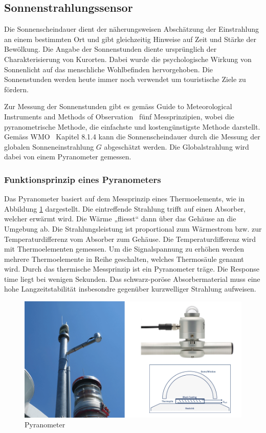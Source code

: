 \subsection{Sonnenstrahlungssensor}
Die Sonnenscheindauer dient der näherungsweisen Abschätzung der Einstrahlung an einem bestimmten Ort und gibt gleichzeitig Hinweise auf Zeit und Stärke der Bewölkung. Die Angabe der Sonnenstunden diente ursprünglich der Charakterisierung von Kurorten. Dabei wurde die psychologische Wirkung von Sonnenlicht auf das menschliche Wohlbefinden hervorgehoben. Die Sonnenstunden werden heute immer noch verwendet um touristische Ziele zu fördern. 

\noindent
Zur Messung der Sonnenstunden gibt es gemäss  \flqq Guide to Meteorological Instruments and Methods of Observation\frqq ~\cite{WMO2014Gtmi}  fünf Messprinzipien, wobei die pyranometrische Methode, die einfachste und kostengünstigste Methode darstellt. Gemäss WMO~\cite{WMO2014Gtmi} Kapitel 8.1.4 kann die Sonnenscheindauer durch die Messung der globalen Sonneneinstrahlung $G$ abgeschätzt werden. Die Globalstrahlung wird dabei von einem Pyranometer gemessen.

\subsubsection{Funktionsprinzip eines Pyranometers}
Das Pyranometer basiert auf dem Messprinzip eines Thermoelements, wie in Abbildung \ref{img:pyranometer}  dargestellt. Die eintreffende Strahlung trifft auf einen Absorber, welcher erwärmt wird. Die Wärme „fliesst“ dann über das Gehäuse an die Umgebung ab. Die Strahlungsleistung ist proportional zum Wärmestrom bzw. zur Temperaturdifferenz vom Absorber zum Gehäuse. Die Temperaturdifferenz wird mit Thermoelementen gemessen. Um die Signalspannung zu erhöhen werden mehrere Thermoelemente in Reihe geschalten, welches Thermosäule genannt wird. Durch das thermische Messprinzip ist ein Pyranometer träge. Die Response time liegt bei wenigen Sekunden. Das schwarz-poröse Absorbermaterial muss eine hohe Langzeitstabilität insbesondre gegenüber kurzwelliger Strahlung aufweisen. 

\begin{figure}[ht]
	\centering
	\includegraphics[width=0.9\linewidth]{img/pyranometer.png}
	\caption{Pyranometer}
	\label{img:pyranometer}
\end{figure}

